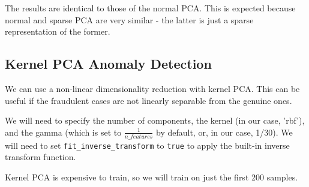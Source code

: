 \documentclass[11pt]{article}
\begin{document}
    The results are identical to those of the normal PCA. This is expected
because normal and sparse PCA are very similar - the latter is just a
sparse representation of the former.

    \subsection{Kernel PCA Anomaly
Detection}\label{kernel-pca-anomaly-detection}

We can use a non-linear dimensionality reduction with kernel PCA. This
can be useful if the fraudulent cases are not linearly separable from
the genuine ones.

We will need to specify the number of components, the kernel (in our
case, 'rbf'), and the gamma (which is set to \(\frac{1}{n\_features}\)
by default, or, in our case, 1/30). We will need to set
\texttt{fit\_inverse\_transform} to \texttt{true} to apply the built-in
inverse transform function.

Kernel PCA is expensive to train, so we will train on just the first 200
samples.
\end{document}
